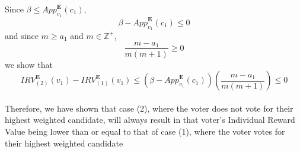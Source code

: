 \documentclass{article}
\begin{document}
Since $\beta \leq {App}^{\pmb{E}}_{v_1}(c_1)$,
\begin{equation}
     \beta - {App}^{\pmb{E}}_{v_1}(c_1) \leq 0
\end{equation}
and since $m \geq a_1$ and $m \in \mathbb{Z}^+$,
\begin{equation}
     \frac{m-a_1}{m(m+1)} \geq 0
\end{equation}
we show that 
\begin{equation}
     {IRV}^{\pmb{E}}_{(2)}(v_1) - {IRV}^{\pmb{E}}_{(1)}(v_1) \leq \left(\beta - {App}^{\pmb{E}}_{v_1}(c_1)\right)\left(\frac{m-a_1}{m(m+1)}\right) \leq 0
\end{equation}\\

Therefore, we have shown that case (2), where the voter does not vote for their highest weighted candidate, will always result in that voter's Individual Reward Value being lower than or equal to that of case (1), where the voter votes for their highest weighted candidate
\end{document}
